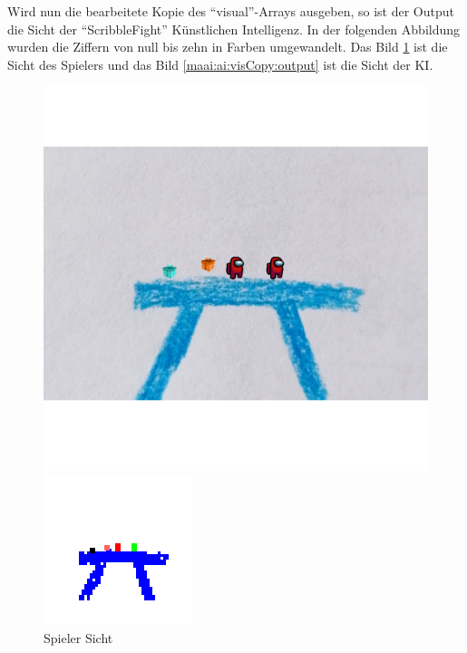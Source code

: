 Wird nun die bearbeitete Kopie des ``visual''-Arrays ausgeben, so ist der Output die Sicht der ``ScribbleFight'' Künstlichen Intelligenz. In der folgenden Abbildung wurden die Ziffern von null bis zehn in Farben umgewandelt. Das Bild \ref{maai:ai:visCopy:input} ist die Sicht des Spielers und das Bild \ref{maai:ai:visCopy:output} ist die Sicht der KI.

\begin{figure}[H]
  \centering
  \begin{minipage}[t]{0.45\linewidth}
    \centering
    \includegraphics[width=\linewidth]{pics/ai/screenshots.png}
    \caption{Spieler Sicht}
    \label{maai:ai:visCopy:input}
  \end{minipage}
  \hfill
  \begin{minipage}[t]{0.45\linewidth}
    \centering
    \includegraphics[width=\linewidth]{pics/ai/newImg.png}

\end{minipage}
\end{figure}
